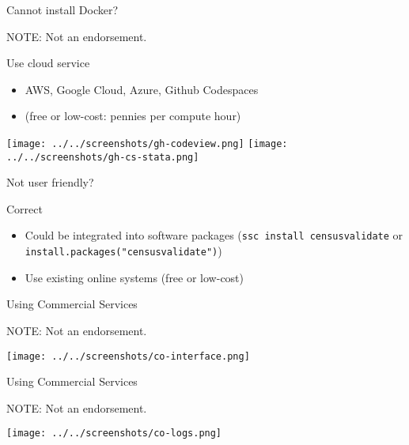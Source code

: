 \begin{frame}{Cannot install Docker?}
\begin{center}
    NOTE: Not an endorsement.
\end{center}
    \begin{block}{Use cloud service}
        \begin{itemize}
            \item AWS, Google Cloud, Azure, Github Codespaces
            \item (free or low-cost: pennies per compute hour)
        \end{itemize}
    \end{block}
\texttt{[image: ../../screenshots/gh-codeview.png]}
\texttt{[image: ../../screenshots/gh-cs-stata.png]}
\end{frame}



\begin{frame}{Not user friendly?}
    \begin{block}{Correct}
        \begin{itemize}
            \item Could be integrated into software packages (\texttt{ssc install censusvalidate} or \texttt{install.packages("censusvalidate")})
            \item Use existing online systems (free or low-cost)
        \end{itemize}
    \end{block}
\end{frame}

\begin{frame}{Using Commercial Services}
\begin{center}
    NOTE: Not an endorsement.
\end{center}
\texttt{[image: ../../screenshots/co-interface.png]}
\end{frame}

\begin{frame}{Using Commercial Services}
\begin{center}
    NOTE: Not an endorsement.

\texttt{[image: ../../screenshots/co-logs.png]}
\end{center}

\end{frame}



